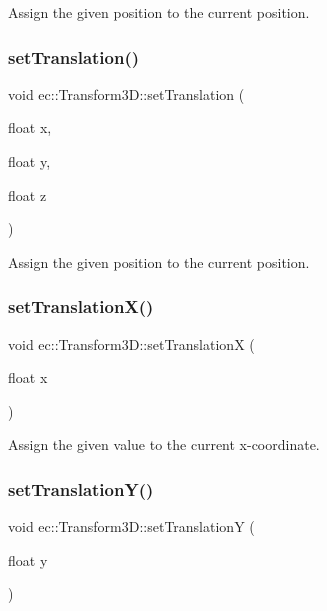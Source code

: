 Assign the given position to the current position. \mbox{\label{classec_1_1_transform3_d_a2671c96409a11a74d9c7cb96d96b274b}} 
\subsubsection{\texorpdfstring{set\+Translation()}{setTranslation()}\hspace{0.1cm}{\footnotesize\ttfamily [2/2]}}
{\footnotesize\ttfamily void ec\+::\+Transform3\+D\+::set\+Translation (\begin{DoxyParamCaption}\item[{float}]{x,  }\item[{float}]{y,  }\item[{float}]{z }\end{DoxyParamCaption})}

Assign the given position to the current position. \mbox{\label{classec_1_1_transform3_d_a51d65455864ed3595a53c40d2f576067}} 
\subsubsection{\texorpdfstring{set\+Translation\+X()}{setTranslationX()}}
{\footnotesize\ttfamily void ec\+::\+Transform3\+D\+::set\+TranslationX (\begin{DoxyParamCaption}\item[{float}]{x }\end{DoxyParamCaption})}

Assign the given value to the current x-\/coordinate. \mbox{\label{classec_1_1_transform3_d_aa9d5eab59374d5e900c17c02a4c64b2f}} 
\subsubsection{\texorpdfstring{set\+Translation\+Y()}{setTranslationY()}}
{\footnotesize\ttfamily void ec\+::\+Transform3\+D\+::set\+TranslationY (\begin{DoxyParamCaption}\item[{float}]{y }\end{DoxyParamCaption})}

